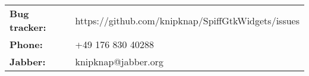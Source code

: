 \begin{tabular}{ll}
{\bf Bug tracker:} & https://github.com/knipknap/SpiffGtkWidgets/issues \\
{\bf Phone:}       & +49 176 830 40288 \\
{\bf Jabber:}      & knipknap@jabber.org
\end{tabular}
